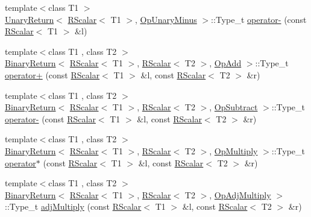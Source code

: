 \begin{DoxyCompactItemize}
\item 
{\footnotesize template$<$class T1 $>$ }\\\mbox{\hyperlink{structENSEM_1_1UnaryReturn}{Unary\+Return}}$<$ \mbox{\hyperlink{classENSEM_1_1RScalar}{R\+Scalar}}$<$ T1 $>$, \mbox{\hyperlink{structENSEM_1_1OpUnaryMinus}{Op\+Unary\+Minus}} $>$\+::Type\+\_\+t \mbox{\hyperlink{group__rscalar_ga2543f899f104b7784d528fadce2253e0}{operator-\/}} (const \mbox{\hyperlink{classENSEM_1_1RScalar}{R\+Scalar}}$<$ T1 $>$ \&l)
\item 
{\footnotesize template$<$class T1 , class T2 $>$ }\\\mbox{\hyperlink{structENSEM_1_1BinaryReturn}{Binary\+Return}}$<$ \mbox{\hyperlink{classENSEM_1_1RScalar}{R\+Scalar}}$<$ T1 $>$, \mbox{\hyperlink{classENSEM_1_1RScalar}{R\+Scalar}}$<$ T2 $>$, \mbox{\hyperlink{structENSEM_1_1OpAdd}{Op\+Add}} $>$\+::Type\+\_\+t \mbox{\hyperlink{group__rscalar_gac30d53b8acaa797f936d2b74a1fbf592}{operator+}} (const \mbox{\hyperlink{classENSEM_1_1RScalar}{R\+Scalar}}$<$ T1 $>$ \&l, const \mbox{\hyperlink{classENSEM_1_1RScalar}{R\+Scalar}}$<$ T2 $>$ \&r)
\item 
{\footnotesize template$<$class T1 , class T2 $>$ }\\\mbox{\hyperlink{structENSEM_1_1BinaryReturn}{Binary\+Return}}$<$ \mbox{\hyperlink{classENSEM_1_1RScalar}{R\+Scalar}}$<$ T1 $>$, \mbox{\hyperlink{classENSEM_1_1RScalar}{R\+Scalar}}$<$ T2 $>$, \mbox{\hyperlink{structENSEM_1_1OpSubtract}{Op\+Subtract}} $>$\+::Type\+\_\+t \mbox{\hyperlink{group__rscalar_ga22496c110ec4476e821ba39707b72b6f}{operator-\/}} (const \mbox{\hyperlink{classENSEM_1_1RScalar}{R\+Scalar}}$<$ T1 $>$ \&l, const \mbox{\hyperlink{classENSEM_1_1RScalar}{R\+Scalar}}$<$ T2 $>$ \&r)
\item 
{\footnotesize template$<$class T1 , class T2 $>$ }\\\mbox{\hyperlink{structENSEM_1_1BinaryReturn}{Binary\+Return}}$<$ \mbox{\hyperlink{classENSEM_1_1RScalar}{R\+Scalar}}$<$ T1 $>$, \mbox{\hyperlink{classENSEM_1_1RScalar}{R\+Scalar}}$<$ T2 $>$, \mbox{\hyperlink{structENSEM_1_1OpMultiply}{Op\+Multiply}} $>$\+::Type\+\_\+t \mbox{\hyperlink{group__rscalar_gadab7ad151ff9bea909186af226815d96}{operator$\ast$}} (const \mbox{\hyperlink{classENSEM_1_1RScalar}{R\+Scalar}}$<$ T1 $>$ \&l, const \mbox{\hyperlink{classENSEM_1_1RScalar}{R\+Scalar}}$<$ T2 $>$ \&r)
\item 
{\footnotesize template$<$class T1 , class T2 $>$ }\\\mbox{\hyperlink{structENSEM_1_1BinaryReturn}{Binary\+Return}}$<$ \mbox{\hyperlink{classENSEM_1_1RScalar}{R\+Scalar}}$<$ T1 $>$, \mbox{\hyperlink{classENSEM_1_1RScalar}{R\+Scalar}}$<$ T2 $>$, \mbox{\hyperlink{structENSEM_1_1OpAdjMultiply}{Op\+Adj\+Multiply}} $>$\+::Type\+\_\+t \mbox{\hyperlink{group__rscalar_gaed3e42d4304edfd5a3838b8b1b559e37}{adj\+Multiply}} (const \mbox{\hyperlink{classENSEM_1_1RScalar}{R\+Scalar}}$<$ T1 $>$ \&l, const \mbox{\hyperlink{classENSEM_1_1RScalar}{R\+Scalar}}$<$ T2 $>$ \&r)

\end{DoxyCompactItemize}
